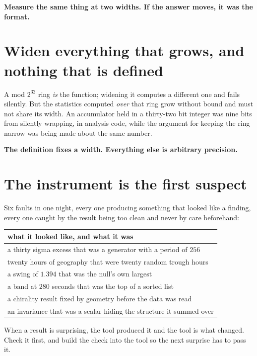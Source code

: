\textbf{Measure the same thing at two widths. If the answer moves, it was the format.}

\section{Widen everything that grows, and nothing that is defined}

A mod \(2^{32}\) ring \emph{is} the function; widening it computes a different one and fails silently. But the statistics computed \emph{over} that ring grow without bound and must not share its width. An accumulator held in a thirty-two bit integer was nine bits from silently wrapping, in analysis code, while the argument for keeping the ring narrow was being made about the same number.

\textbf{The definition fixes a width. Everything else is arbitrary precision.}

\section{The instrument is the first suspect}

Six faults in one night, every one producing something that looked like a finding, every one caught by the result being too clean and never by care beforehand:

\begin{center}
\begin{tabular}{@{}l@{}}
\toprule
what it looked like, and what it was \\
\midrule
a thirty sigma excess that was a generator with a period of \(256\) \\
twenty hours of geography that were twenty random trough hours \\
a swing of \(1.394\) that was the null's own largest \\
a band at \(280\) seconds that was the top of a sorted list \\
a chirality result fixed by geometry before the data was read \\
an invariance that was a scalar hiding the structure it summed over \\
\bottomrule
\end{tabular}
\end{center}

When a result is surprising, the tool produced it and the tool is what changed. Check it first, and build the check into the tool so the next surprise has to pass it.

